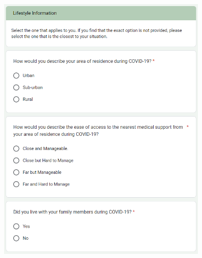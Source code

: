 \documentclass[12pt, english]{article}
\begin{document}
\begin{figure}[h]
    \centering
    \begin{minipage}{0.45\textwidth}
        \centering
        \includegraphics[width=0.9\textwidth]{images/lifestyle_1.png} %


\end{minipage}
\end{figure}
\end{document}
